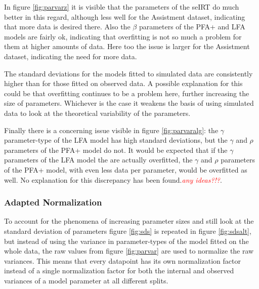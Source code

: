 \documentclass{scrartcl}
\newcommand\todo[1]{\textit{\textcolor{red}{#1}}}
\begin{document}
In figure \ref{fig:parvarz} it is visible that the parameters of the seIRT do much better in this regard, although less well for the Assistment dataset, indicating that more data is desired there. Also the $\beta$ parameters of the PFA+ and LFA models are fairly ok, indicating that overfitting is not so much a problem for them at higher amounts of data. Here too the issue is larger for the Assistment dataset, indicating the need for more data.

The standard deviations for the models fitted to simulated data are consistently higher than for those fitted on observed data. A possible explanation for this could be that overfitting continues to be a problem here, further increasing the size of parameters. Whichever is the case it weakens the basis of using simulated data to look at the theoretical variability of the parameters.

Finally there is a concerning issue visible in figure \ref{fig:parvaralg}: the $\gamma$ parameter-type of the LFA model has high standard deviations, but the $\gamma$ and $\rho$ parameters of the PFA+ model do not. It would be expected that if the $\gamma$ parameters of the LFA model the are actually overfitted, the $\gamma$ and $\rho$ parameters of the PFA+ model, with even less data per parameter, would be overfitted as well. No explanation for this discrepancy has been found.\todo{any ideas?!?}. 

\subsubsection{Adapted Normalization}
To account for the phenomena of increasing parameter sizes and still look at the standard deviation of parameters figure \ref{fig:sds} is repeated in figure \ref{fig:sdsalt}, but instead of using the variance in parameter-types of the model fitted on the whole data, the raw values from figure \ref{fig:parvar} are used to normalize the raw variances. This means that every datapoint has its own normalization factor instead of a single normalization factor for both the internal and observed variances of a model parameter at all different splits.
\end{document}
